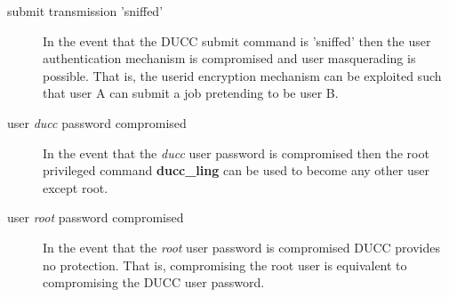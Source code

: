     \begin{description}
    \item[submit transmission 'sniffed'] In the event that the DUCC submit
    command is 'sniffed' then the user authentication mechanism is compromised
    and user masquerading is possible.  That is, the userid encryption mechanism
    can be exploited such that user A can submit a job pretending to be user B.
    \item[user \textit{ducc} password compromised] In the event that the \textit{ducc}
    user password is compromised then the root privileged command
    \textbf{ducc\_ling} can be used to become any other user except root.
    \item[user \textit{root} password compromised] In the event that the
    \textit{root} user password is compromised DUCC provides no protection. 
    That is, compromising the root user is equivalent to compromising the DUCC
    user password.
    \end{description}  
     
